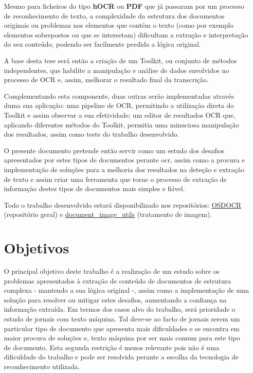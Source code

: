 Mesmo para ficheiros do tipo \textbf{hOCR} ou \textbf{PDF} que já passaram por um processo de reconhecimento de texto, a complexidade da estrutura dos documentos originais ou problemas nos elementos que contém o texto (como por exemplo elementos sobrepostos ou que se intersetam) dificultam a extração e interpretação do seu conteúdo, podendo ser facilmente perdida a lógica original.

A base desta tese será então a criação de um Toolkit, ou conjunto de métodos independentes, que habilite a manipulação e análise de dados envolvidos no processo de OCR e, assim, melhorar o resultado final da transcrição.

Complementando esta componente, duas outras serão implementadas através duma sua aplicação: uma pipeline de OCR, permitindo a utilização direta do Toolkit e assim observar a sua efetividade; um editor de resultados OCR que, aplicando diferentes métodos do Toolkit, permitia uma minuciosa manipulação dos resultados, assim como teste do trabalho desenvolvido. 

O presente documento pretende então servir como um estudo dos desafios apresentados por estes tipos de documentos perante \acrshort{ocr}, assim como a procura e implementação de soluções para a melhoria dos resultados na deteção  e extração de texto e assim criar uma ferramenta que torne o processo de extração de informação destes tipos de documentos mais simples e fiável. 

Todo o trabalho desenvolvido estará disponibilizado nos repositórios: \href{https://github.com/brazafonso/OCR-old_documents}{OSDOCR} (repositório geral) e \href{https://github.com/brazafonso/document_image_processing}{document\_image\_utils} (tratamento de imagem).

\section{Objetivos}
\label{section_objetivos}

O principal objetivo deste trabalho é a realização de um estudo sobre os problemas apresentados à extração de conteúdo de documentos de estrutura complexa - mantendo 
a sua lógica original -, assim como a implementação de uma solução para resolver ou mitigar estes desafios, aumentando a confiança na informação extraída. 
Em termos dos casos alvo do trabalho, será prioridade o estudo de jornais com texto máquina. Tal deve-se ao facto de jornais serem um particular tipo de documento que apresenta mais dificuldades e se encontra em maior procura de soluções e, texto máquina por ser mais comum para este tipo de documento. Esta segunda restrição é menos relevante pois não é uma dificuldade do trabalho e pode ser resolvida perante a escolha da tecnologia de reconhecimento utilizada.

